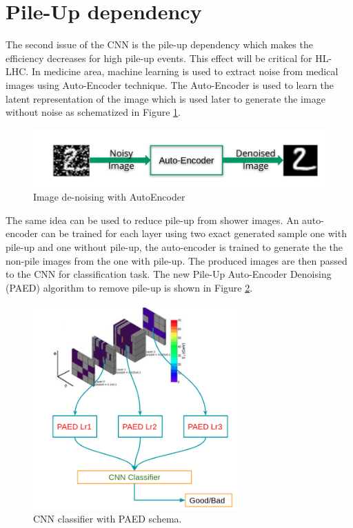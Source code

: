 \section{Pile-Up dependency}
The second issue of the CNN is the pile-up dependency which makes the efficiency decreases for high pile-up events. This effect will be critical for HL-LHC. In medicine area, machine learning is used to extract noise from medical images using Auto-Encoder technique. The Auto-Encoder is used to learn the latent representation of the image which is used later to generate the image without noise as schematized in Figure \ref{fig:Adx3:AutoEncoder}.

\begin{figure}[H]
    \centering
    \includegraphics[width=1\textwidth]{Adx/Adx3/Img/AutoEncoder.png}
    \caption{Image de-noising with AutoEncoder}
    \label{fig:Adx3:AutoEncoder}
\end{figure}

The same idea can be used to reduce pile-up from shower images. An auto-encoder can be trained for each layer using two exact generated sample one with pile-up and one without pile-up, the auto-encoder is trained to generate the the non-pile images from the one with pile-up. The produced images are then passed to the CNN for classification task. The new Pile-Up Auto-Encoder Denoising (PAED) algorithm to remove pile-up is shown in Figure \ref{fig:Adx3:PAED}.

\begin{figure}[htbp]
    \centering
    \includegraphics[width=0.7\textwidth]{Adx/Adx3/Img/PAED.png}
    \caption{CNN classifier with PAED schema.}
    \label{fig:Adx3:PAED}
\end{figure}